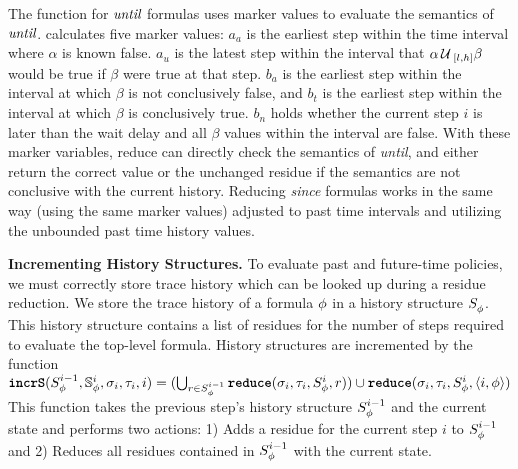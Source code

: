 The \reduce function for $\emph{until}$ formulas uses marker values to evaluate the semantics of $\emph{until}$. \reduce calculates five marker values: $a_a$ is the earliest step within the time interval where $\alpha$ is known false. $a_u$ is the latest step within the interval that $\alpha \until_{[l,h]} \beta$ would be true if $\beta$ were true at that step. $b_a$ is the earliest step within the interval at which $\beta$ is not conclusively false, and $b_t$ is the earliest step within the interval at which $\beta$ is conclusively true. $b_n$ holds whether the current step $i$ is later than the wait delay and all $\beta$ values within the interval are false. With these marker variables, reduce can directly check the semantics of \emph{until}, and either return the correct value or the unchanged residue if the semantics are not conclusive with the current history. Reducing \emph{since} formulas works in the same way (using the same marker values) adjusted to past time intervals and utilizing the unbounded past time history values.


\textbf{Incrementing History Structures.}
To evaluate past and future-time policies, we must correctly store trace history which can be looked up during a residue reduction.
We store the trace history of a formula $\policyv$ in a history structure $\histst[\policyv]{}$.
This history structure contains a list of residues for the number of steps required to evaluate the top-level formula. History structures are incremented by the function
$\incrS(\histst[\policyv]{i-1}, \histSt[\policyv]{i}, \sigma_i, \tau_i, i) = (\bigcup_{r \in \histst[\policyv]{i-1}} \reduce(\sigma_i, \tau_i, \histst[\policyv]{i}, r)) \cup \reduce(\sigma_i, \tau_i, \histst[\policyv]{i}, \rp{i}{\policyv})$
%
This function takes the previous step's history structure $\histst[\policyv]{i-1}$ and the current state
and performs two actions:
	1) Adds a residue for the current step $i$ to $\histst[\policyv]{i-1}$ and
	2) Reduces all residues contained in $\histst[\policyv]{i-1}$ with the current state.



